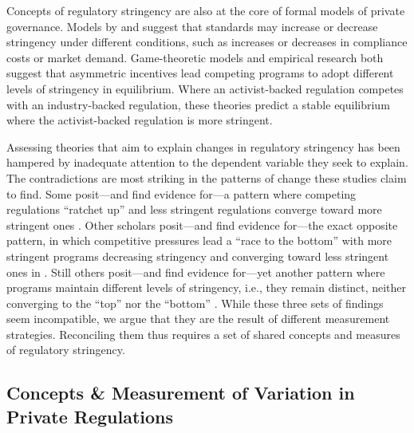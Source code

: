 \documentclass[
      12pt,
            Review ]{article}
\begin{document}
Concepts of regulatory stringency are also at the core of formal models
of private governance. Models by \citet{Abderrazak2009} and
\citet{Fischer2014} suggest that standards may increase or decrease
stringency under different conditions, such as increases or decreases in
compliance costs or market demand. Game-theoretic models
\citep{Fischer2014, Li2015, Poret2016} and empirical research
\citep{Cashore2004} both suggest that asymmetric incentives lead
competing programs to adopt different levels of stringency in
equilibrium. Where an activist-backed regulation competes with an
industry-backed regulation, these theories predict a stable equilibrium
where the activist-backed regulation is more stringent.

Assessing theories that aim to explain changes in regulatory stringency
has been hampered by inadequate attention to the dependent variable they
seek to explain. The contradictions are most striking in the patterns of
change these studies claim to find. Some posit---and find evidence
for---a pattern where competing regulations ``ratchet up'' and less
stringent regulations converge toward more stringent ones
\citep{Overdevest2005, Overdevest2010, Overdevest2014}. Other scholars
posit---and find evidence for---the exact opposite pattern, in which
competitive pressures lead a ``race to the bottom'' with more stringent
programs decreasing stringency and converging toward less stringent ones
in \citep{Abbott2010, Fransen2011, Gulbrandsen2004}. Still others
posit---and find evidence for---yet another pattern where programs
maintain different levels of stringency, i.e., they remain distinct,
neither converging to the ``top'' nor the ``bottom''
\citep{Fischer2014, Li2015, Poret2016, Cashore2004}. While these three
sets of findings seem incompatible, we argue that they are the result of
different measurement strategies. Reconciling them thus requires a set
of shared concepts and measures of regulatory stringency.

\subsection{Concepts \& Measurement of Variation in Private
Regulations}\label{concepts-measurement-of-variation-in-private-regulations}
\end{document}
